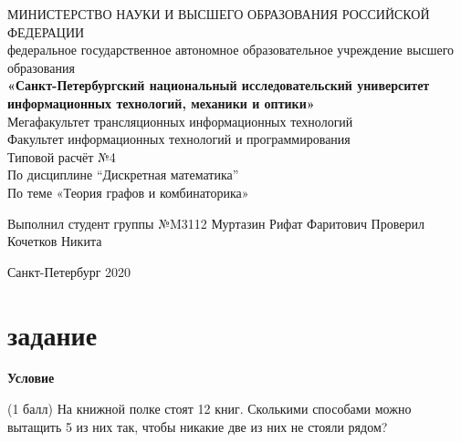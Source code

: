 \documentclass[a4paper]{article}
\begin{document}
 
\begin{center}
\hfill \break
\large{МИНИСТЕРСТВО НАУКИ И ВЫСШЕГО ОБРАЗОВАНИЯ РОССИЙСКОЙ ФЕДЕРАЦИИ}\\
\footnotesize{федеральное государственное автономное образовательное учреждение высшего образования}\\ 
\small{\textbf{«Санкт-Петербургский национальный исследовательский университет информационных технологий, механики и оптики»}}\\
\hfill \break
\normalsize{Мегафакультет трансляционных информационных технологий}\\
 \hfill \break
\normalsize{Факультет информационных технологий и программирования}\\
\hfill\break
\hfill \break
\hfill \break
\hfill \break
\large{\Huge{Типовой расчёт №4}}\\
\Large{По дисциплине “Дискретная математика”}\\
\Large{По теме «Теория графов и комбинаторика»}\\
\hfill \break
\hfill \break

\hfill \break

\hfill \break
\large{ \hspace{28pt} Выполнил студент группы №M3112} \hfill \break
\large{ \hspace{28pt} Муртазин Рифат Фаритович} \hfill \break
\hfill \break
\large{ \hspace{28pt} Проверил} \hfill \break
\large{ \hspace{28pt} Кочетков Никита} \hfill \break
\hfill \break
\hfill \break
\hfill \break
\hfill \break
\begin{center} Санкт-Петербург 2020 \end{center}
\thispagestyle{empty} %
 

\newpage
 
\newpage

\section{задание}

\begin{flushleft}
    \textbf{{\Large Условие}}
\end{flushleft}
(1 балл) На книжной полке стоят 12 книг. Сколькими способами можно вытащить 5 из них так, чтобы никакие две из них не стояли рядом?
\hfill \break


\end{center}
\end{document}
